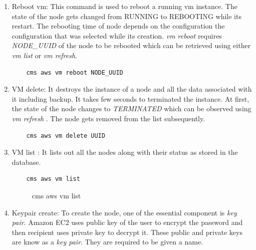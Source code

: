 \documentclass[9pt,twocolumn,twoside]{../../styles/osajnl}
\begin{document}
\begin{enumerate}
  \item Reboot vm: This command is used to reboot a running vm
    instance. The state of the node gets changed from RUNNING to
    REBOOTING while its restart. The rebooting time of node depends on
    the configuration the configuration that was selected while its
    creation. \textit{vm reboot} requires \textit{NODE\_UUID} of the
    node to be rebooted which can be retrieved using either \textit{vm
      list} or \textit{vm refresh}.
    
    \begin{verbatim}
    cms aws vm reboot NODE_UUID
    \end{verbatim}
    
  \item VM delete: It destroys the instance of a node and all the data
    associated with it including backup. It takes few seconds to
    terminated the instance. At first, the state of the node changes
    to \textit{TERMINATED} which can be observed using \textit{vm
      refresh} . The node gets removed from the list subsequently.
    
    \begin{verbatim}
    cms aws vm delete UUID
    \end{verbatim}
    
    \item VM list : It lists out all the nodes along with their status as stored in the database.
    
    \begin{verbatim}
    cms aws vm list
    \end{verbatim}
    
     \begin{figure}[h!]
    	\centering
    	\caption{cms aws vm list }
    	\label{fig:vmlist}
    \end{figure}

    \item Keypair create: To create the node, one of the essential component is \textit{key pair}. Amazon EC2 uses public key of the user to encrypt the password and then recipient uses private key to decrypt it. These public and private keys are know as a \textit{key pair}. They are required to be given a name.
    

\end{enumerate}
\end{document}
